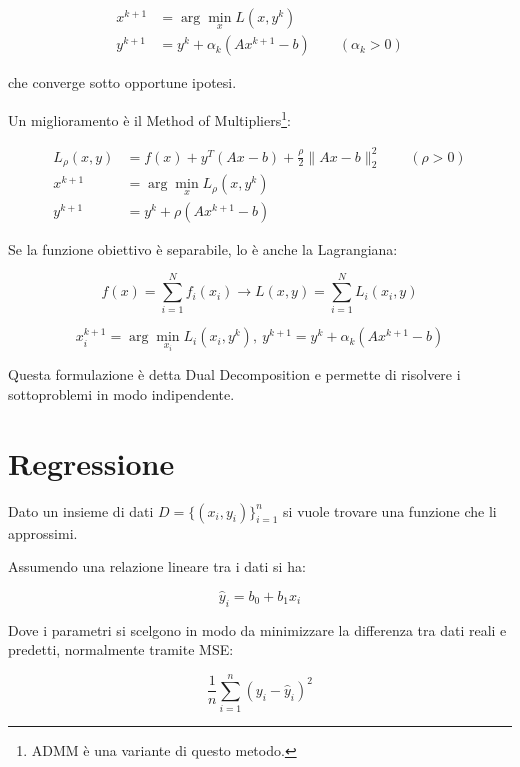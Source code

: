\documentclass{article}
\begin{document}
\begin{align*}
x^{k+1} &= \arg\min_x L(x,y^k)\\
y^{k+1} &= y^k+\alpha_k(Ax^{k+1}-b)\qquad (\alpha_k>0)
\end{align*}

\vspace{5pt}

che converge sotto opportune ipotesi.\newline

Un miglioramento è il Method of Multipliers\footnote{ADMM è una variante di questo metodo.}:

\begin{align*}
L_\rho(x,y)&=f(x)+y^T(Ax-b)+\frac \rho2\|Ax-b\|_2^2\qquad (\rho>0)\\
x^{k+1} &= \arg\min_x L_\rho(x,y^k)\\
y^{k+1} &= y^k+\rho(Ax^{k+1}-b)\qquad 
\end{align*}\newline

Se la funzione obiettivo è separabile, lo è anche la Lagrangiana:

$$
f(x)=\sum_{i=1}^{N}f_i(x_i)\rightarrow L(x,y)=\sum_{i=1}^{N}L_i(x_i,y)
$$

$$
x_i^{k+1}=\arg\min_{x_i}L_i(x_i,y^k),\ y^{k+1}=y^k+\alpha_k(Ax^{k+1}-b)
$$

\vspace{5pt}

Questa formulazione è detta Dual Decomposition e permette di risolvere i sottoproblemi in modo indipendente.

\section{Regressione}

Dato un insieme di dati $D=\{(x_i,y_i)\}_{i=1}^{n}$ si vuole trovare una funzione che li approssimi.\newline

Assumendo una relazione lineare tra i dati si ha:

\[
\hat{y}_i=b_0+b_1x_i
\]

\vspace{5pt}

Dove i parametri si scelgono in modo da minimizzare la differenza tra
dati reali e predetti, normalmente tramite MSE:

\[
\frac1n \sum_{i=1}^n(y_i-\hat y_i)^2
\]

\vspace{5pt}
\end{document}
